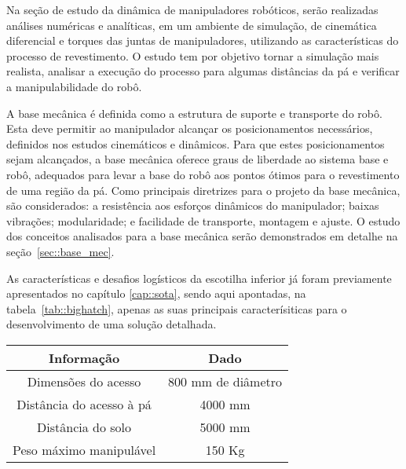 Na seção de estudo da dinâmica de manipuladores robóticos, serão realizadas
análises numéricas e analíticas, em um ambiente de simulação, de cinemática
diferencial e torques das juntas de manipuladores, utilizando as características
do processo de revestimento. O estudo tem por objetivo tornar a simulação mais
realista, analisar a execução do processo para algumas distâncias da pá
e verificar a manipulabilidade do robô.

A base mecânica é definida como a estrutura de suporte e transporte do robô.
Esta deve permitir ao manipulador alcançar os posicionamentos necessários, 
definidos nos estudos cinemáticos e dinâmicos. Para que estes
posicionamentos sejam alcançados, a base mecânica oferece graus de
liberdade ao sistema base e robô, adequados para levar a base do robô aos pontos
ótimos para o revestimento de uma região da pá. Como principais diretrizes para
o projeto da base mecânica, são considerados: a resistência aos esforços dinâmicos do
manipulador; baixas vibrações; modularidade; e facilidade de transporte,
montagem e ajuste. O estudo dos conceitos analisados para a base mecânica serão
demonstrados em detalhe na seção~\ref{sec::base_mec}.

As características e desafios logísticos da escotilha inferior já foram
previamente apresentados no capítulo \ref{cap::sota}, sendo aqui apontadas, na
tabela~\ref{tab::bighatch}, apenas as suas principais caracterísiticas para o
desenvolvimento de uma solução detalhada.

\begin{center}
\begin{tabular}{  c | c  }
  \hline
  \textbf{Informação} & \textbf{Dado} \\ \hline
  Dimensões do acesso & 800 mm de diâmetro  \\ \hline
  Distância do acesso à pá & 4000 mm  \\ \hline
  Distância do solo & 5000 mm \\ \hline
  Peso máximo manipulável & 150 Kg \\
  \hline
\end{tabular}
\label{tab::bighatch}
\end{center}

 



